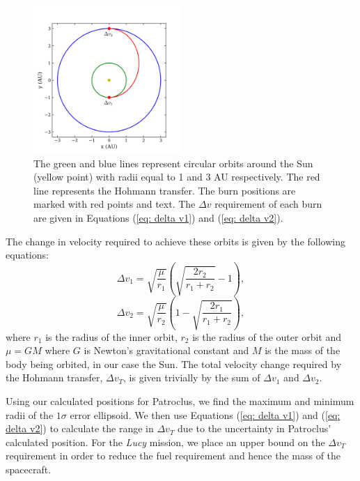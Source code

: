 \documentclass[10pt, twocolumn]{revtex4}    %
\begin{document}
\begin{figure}[h!]
\centering
\includegraphics[width=0.5\textwidth]{20180410_200052_HOHMANN_TRANSFER_EXAMPLE}
\caption{The green and blue lines represent circular orbits around the Sun (yellow point) with radii equal to 1 and 3 AU respectively. The red line represents the Hohmann transfer. The burn positions are marked with red points and text. The $\Delta v$ requirement of each burn are given in Equations (\ref{eq: delta v1}) and (\ref{eq: delta v2}).}
\label{fig: hohmann trasnfer}
\end{figure}

The change in velocity required to achieve these orbits is given by the following equations:
\begin{equation} \label{eq: delta v1}
\Delta v_1 = \sqrt{\frac{\mu}{r_1}}\left( \sqrt{\frac{2r_2}{r_1+r_2}}-1 \right),
\end{equation} 
\begin{equation} \label{eq: delta v2}
\Delta v_2 = \sqrt{\frac{\mu}{r_2}}\left( 1- \sqrt{\frac{2r_1}{r_1+r_2}} \right),
\end{equation} 
where $r_1$ is the radius of the inner orbit, $r_2$ is the radius of the outer orbit and $\mu = GM$ where $G$ is Newton's gravitational constant and $M$ is the mass of the body being orbited, in our case the Sun. The total velocity change required by the Hohmann transfer, $\Delta v_{T}$, is given trivially by the sum of $\Delta v_1$ and $\Delta v_2$.

Using our calculated positions for Patroclus, we find the maximum and minimum radii of the $1\sigma$ error ellipsoid. We then use Equations (\ref{eq: delta v1}) and (\ref{eq: delta v2}) to calculate the range in $\Delta v_{T}$ due to the uncertainty in Patroclus' calculated position. For the \textit{Lucy} mission, we place an upper bound on the $\Delta v_{T}$ requirement in order to reduce the fuel requirement and hence the mass of the spacecraft.
\end{document}
